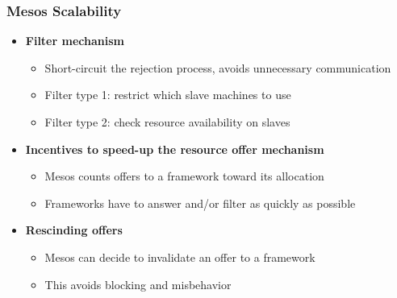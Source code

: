 \begin{frame}
\frametitle{Mesos Scalability}
\begin{itemize}
	\item {\bf Filter mechanism}
	\begin{itemize}
		\item Short-circuit the rejection process, avoids unnecessary communication
		\item Filter type 1: restrict which slave machines to use
		\item Filter type 2: check resource availability on slaves
	\end{itemize}

\vspace{20pt}

	\item {\bf Incentives to speed-up the resource offer mechanism}
	\begin{itemize}
		\item Mesos counts offers to a framework toward its allocation
		\item Frameworks have to answer and/or filter as quickly as possible
	\end{itemize}

\vspace{20pt}

	\item {\bf Rescinding offers}
	\begin{itemize}
		\item Mesos can decide to invalidate an offer to a framework
		\item This avoids blocking and misbehavior
	\end{itemize}
\end{itemize}
\end{frame}

